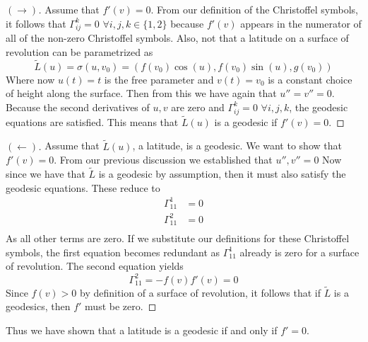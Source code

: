 \documentclass[a4paper, 11pt]{article}
\begin{document}
\begin{enumerate}[label=\alph*]
			\begin{proof}[$(\rightarrow)$]
				Assume that $f'(v) = 0$. From our definition of the Christoffel symbols, it follows that $\Gamma_{ij}^k = 0$ $\forall i,j,k\in\{1,2\}$ because $f'(v)$ appears in the numerator of all of the non-zero Christoffel symbols. Also, not that a latitude on a surface of revolution can be parametrized as
					\begin{equation*}
						\tilde{L}(u) = \sigma(u, v_0) = (f(v_0)\cos(u), f(v_0)\sin(u), g(v_0))
					\end{equation*}
				Where now $u(t)=t$ is the free parameter and $v(t)=v_0$ is a constant choice of height along the surface. Then from this we have again that $u'' = v'' = 0$. Because the second derivatives of $u, v$ are zero and $\Gamma_{ij}^k=0$  $\forall i,j,k$, the geodesic equations are satisfied. This means that $\tilde{L}(u)$ is a geodesic if $f'(v)=0$. 
			\end{proof}
			\begin{proof}[$(\leftarrow)$]
				Assume that $\tilde{L}(u)$, a latitude, is a geodesic. We want to show that $f'(v)=0$. From our previous discussion we established that $u'', v'' =0$ Now since we have that $\tilde{L}$ is a geodesic by assumption, then it must also satisfy the geodesic equations. These reduce to
					\begin{align*}
						\Gamma_{11}^1 &= 0 \\ 
						\Gamma_{11}^2 &= 0 \\ 
					\end{align*}
				As all other terms are zero. If we substitute our definitions for these Christoffel symbols, the first equation becomes redundant as $\Gamma_{11}^1$ already is zero for a surface of revolution. The second equation yields
					\begin{equation*}
						\Gamma_{11}^2 = -f(v)f'(v) = 0 
					\end{equation*}
				Since $f(v)>0$ by definition of a surface of revolution, it follows that if $\tilde{L}$ is a geodesics, then $f'$ must be zero. 
			\end{proof}
			Thus we have shown that a latitude is a geodesic if and only if $f'=0$. 
			

\end{enumerate}
\end{document}
